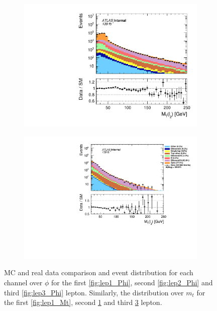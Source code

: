 \begin{figure}[H]
{\begin{subfigure}{.405\textwidth}
        \includegraphics[width=\textwidth]{Figures/FeaturesHistograms/MCvsData/lep2_Mt.pdf}
        \caption{}
        \label{fig:lep2_Mt}
    \end{subfigure}
    \hfill
    \begin{subfigure}{.525\textwidth}
        \includegraphics[width=\textwidth]{Figures/FeaturesHistograms/MCvsData/lep3_Mt.pdf}
        \caption{}
        \label{fig:lep3_Mt}
    \end{subfigure}
    }
    \caption{\ac{MC} and real data comparison and event distribution for each channel over $\phi$ for the first \ref{fig:lep1_Phi}, 
    second \ref{fig:lep2_Phi} and third \ref{fig:lep3_Phi} lepton. Similarly, the distribution over $m_t$
    for the first \ref{fig:lep1_Mt}, second \ref{fig:lep2_Mt} and third \ref{fig:lep3_Mt} lepton.}
\end{figure}
